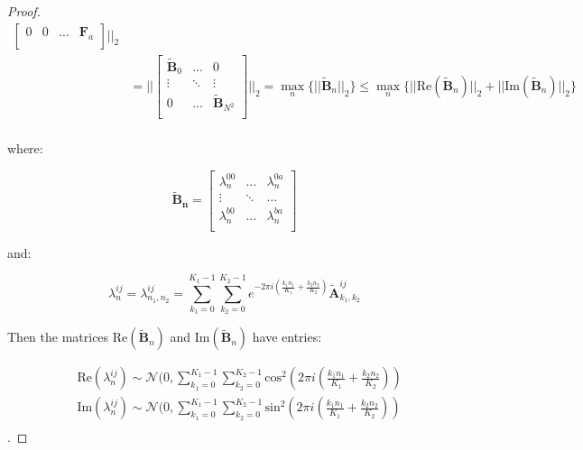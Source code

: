 \documentclass{article} %
\theoremstyle{definition}
\begin{document}
\begin{proof}
\begin{equation}
\begin{split}
\begin{bmatrix}
    0  & 0 & \hdots & \boldsymbol{F}_{a}  \\
\end{bmatrix}||_2 \\
& = 
||
\begin{bmatrix}
    \boldsymbol{\tilde{B}}_{0}  & ... & 0  \\
    \vdots  & \ddots & \vdots  \\
    0  & ... & \boldsymbol{\tilde{B}}_{N^2}  \\
\end{bmatrix} ||_2 
= \max_n\{ ||\boldsymbol{\tilde{B} }_n||_2 \} \leq \max_n\{ ||\text{Re}(\boldsymbol{\tilde{B}}_n)||_2 + ||\text{Im}(\boldsymbol{\tilde{B}}_n)||_2 \} \\
\end{split}
\end{equation}

 where:

\begin{equation}
\boldsymbol{\tilde{B}_{n}} = 
\begin{bmatrix}
    \lambda_n^{00}  & \hdots & \lambda_n^{0a}  \\
    \vdots  & \ddots & \hdots  \\
    \lambda_n^{b0}  & \hdots & \lambda_n^{ba}  \\
\end{bmatrix}
\end{equation}

and:

\begin{equation}
\lambda_n^{ij} = \lambda_{n_1,n_2}^{ij} = \sum_{k_1 = 0}^{K_1 - 1} \sum_{k_2 = 0}^{K_2 - 1} e^{-2 \pi i (\frac{k_1 n_1}{K_1}+\frac{k_2 n_2}{K_2})} \boldsymbol{\tilde{A}}^{ij}_{k_1,k_2}
\end{equation}

Then the matrices $\text{Re}(\boldsymbol{\tilde{B}}_n)$ and $\text{Im}(\boldsymbol{\tilde{B}}_n)$ have entries:

\begin{equation}
\begin{split}
& \text{Re}(\lambda_{n}^{ij}) \sim \mathcal{N}(0, \sum_{k_1 = 0}^{K_1 - 1} \sum_{k_2 = 0}^{K_2 - 1}\text{cos}^2(2 \pi i (\frac{k_1 n_1}{K_1}+\frac{k_2 n_2}{K_2})) \\
& \text{Im}(\lambda_{n}^{ij}) \sim \mathcal{N} (0, \sum_{k_1 = 0}^{K_1 - 1} \sum_{k_2 = 0}^{K_2 - 1}\text{sin}^2(2 \pi i (\frac{k_1 n_1}{K_1}+\frac{k_2 n_2}{K_2})) \\
\end{split}
\end{equation}.


\end{proof}
\end{document}
